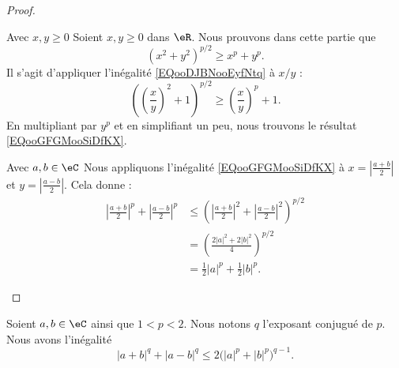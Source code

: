 \begin{proof}
\begin{subproof}
        \item[Avec \( x,y\geq 0\)]
            Soient \( x,y\geq 0\) dans \( \eR\). Nous prouvons dans cette partie que
            \begin{equation}        \label{EQooGFGMooSiDfKX}
                (x^2+y^2)^{p/2}\geq x^p+y^p.
            \end{equation}
            Il s'agit d'appliquer l'inégalité \eqref{EQooDJBNooEyfNtq} à \( x/y\) :
            \begin{equation}
                \left( \left( \frac{ x }{ y } \right)^2+1 \right)^{p/2}\geq \left( \frac{ x }{ y } \right)^p+1.
            \end{equation}
            En multipliant par \( y^p\) et en simplifiant un peu, nous trouvons le résultat \eqref{EQooGFGMooSiDfKX}.
        \item[Avec \( a,b\in \eC\)]
            Nous appliquons l'inégalité \eqref{EQooGFGMooSiDfKX} à \( x=| \frac{ a+b }{ 2 } |\) et \( y=| \frac{ a-b }{2} |\). Cela donne :
            \begin{subequations}
                \begin{align}
                    \left| \frac{ a+b }{2} \right|^p+\left| \frac{ a-b }{2} \right|^p&\leq \left( \left| \frac{ a+b }{2} \right|^2+\left| \frac{ a-b }{2} \right|^2 \right)^{p/2}\\
                    &=\left( \frac{ 2| a |^2+2| b |^2 }{ 4 } \right)^{p/2}\\
                    &=\frac{ 1 }{2}| a |^p+\frac{ 1 }{2}| b |^p.
                \end{align}
            \end{subequations}
    \end{subproof}
\end{proof}

\begin{lemma}       \label{LEMooLTROooVusGte}
    Soient \( a,b\in \eC\) ainsi que \( 1<p<2\). Nous notons \( q\) l'exposant conjugué de \( p\). Nous avons l'inégalité
    \begin{equation}
        | a+b |^q+| a-b |^q\leq 2\big( | a |^p+| b |^p \big)^{q-1}.
    \end{equation}
\end{lemma}

